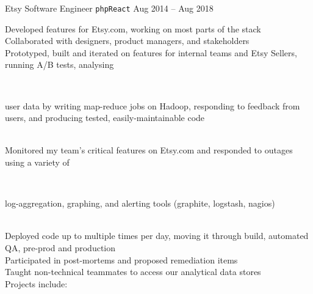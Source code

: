 \documentclass[9pt]{developercv} %
\begin{document}



\begin{entrylist}
    \entry
        {Etsy}
        {Software Engineer \hspace{1mm}\texttt{php}\slashsep\texttt{React}}
        {Aug 2014 -- Aug 2018}
        {
            Developed features for Etsy.com, working on most parts of the stack\\
            Collaborated with designers, product managers, and stakeholders\\
            Prototyped, built and iterated on features for internal teams and Etsy Sellers, running A/B tests, analysing\\
                \begin{minipage}[t]{0.05\textwidth}\,\end{minipage}
                \begin{minipage}[t]{0.85\textwidth}user data by writing map-reduce jobs on Hadoop, responding to feedback from users, and producing tested, easily-maintainable code\end{minipage}\\
            Monitored my team's critical features on Etsy.com and responded to outages using a variety of\\
                \begin{minipage}[t]{0.05\textwidth}\,\end{minipage}
                \begin{minipage}[t]{0.85\textwidth}log-aggregation, graphing, and alerting tools (graphite, logstash, nagios)\end{minipage}\\
            Deployed code up to multiple times per day, moving it through build, automated QA, pre-prod and production\\
            Participated in post-mortems and proposed remediation items\\
            Taught non-technical teammates to access our analytical data stores\\
            Projects include:\\
}
\end{entrylist}
\end{document}
